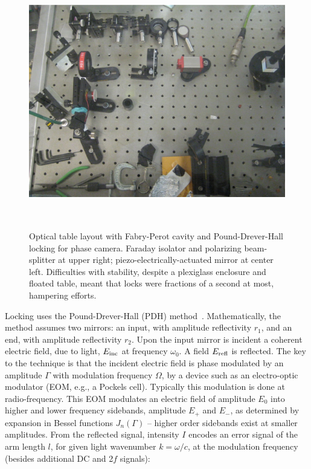 \begin{figure}
\begin{center}
\includegraphics[height=111mm, width=148mm]{Optical_table_phase_camera.eps}
\caption{Optical table layout with Fabry-Perot cavity and Pound-Drever-Hall locking for phase camera. Faraday isolator and polarizing beam-splitter at upper right; piezo-electrically-actuated mirror at center left. Difficulties with stability, despite a plexiglass enclosure and floated table, meant that locks were fractions of a second at most, hampering efforts.}
\label{phase_camera_optical_table}
\end{center}
\end{figure}

Locking uses the Pound-Drever-Hall (PDH) method~\cite{PDHNotes,MavalvalaThesis}.
Mathematically, the method assumes two mirrors: an input, with amplitude reflectivity $r_1$, and an end, with amplitude reflectivity $r_2$.
Upon the input mirror is incident a coherent electric field, due to light, $E_\textup{inc}$ at frequency $\omega_0$. A field $E_{\textup{refl}}$ is reflected.
The key to the technique is that the incident electric field is phase modulated by an amplitude $\Gamma$ with modulation frequency $\Omega$, by a device such as an electro-optic modulator (EOM, e.g., a Pockels cell).
Typically this modulation is done at radio-frequency.
This EOM modulates an electric field of amplitude $E_0$ into higher and lower frequency sidebands, amplitude $E_+$ and $E_-$, as determined by expansion in Bessel functions $J_n(\Gamma)$ -- higher order sidebands exist at smaller amplitudes.
From the reflected signal, intensity $I$ encodes an error signal of the arm length $l$, for given light wavenumber $k = \omega / c$, at the modulation frequency (besides additional DC and 2$f$ signals):

